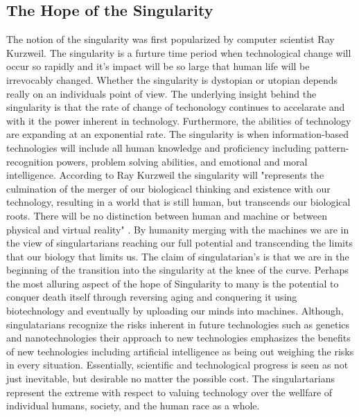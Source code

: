 \subsection{The Hope of the Singularity}
\label{sec:-singularity}
 The notion of the singularity was first popularized by computer scientist Ray Kurzweil. The singularity is a furture 
time period when technological change will occur so rapidly and it's impact will be so large that human life will be 
irrevocably changed. Whether the singularity is dystopian or utopian depends really on an individuals point of view. 
The underlying insight behind the singularity is that the rate of change of techonology continues to accelarate and with it
the power inherent in technology. Furthermore, the abilities of technology are expanding at an exponential rate. The singularity is when information-based technologies will include all human knowledge  and proficiency including pattern-recognition powers, problem solving abilities, and emotional and moral intelligence. According to Ray Kurzweil the singularity will "represents the culmination of the merger of our biologicacl thinking and existence with our technology, resulting in a world that is still human, but transcends our biological roots. There will be no distinction between human and machine or between physical and virtual reality" \cite{kurzweil2005singularity}. By humanity merging with the machines we are in the view of singulartarians reaching our full potential and transcending the limits that our biology that limits us. The claim of singulatarian's is that we are in the beginning of the transition into the singularity at the knee of the curve. Perhaps the most alluring aspect of the hope of Singularity to many is the potential to conquer death itself through reversing aging and conquering it using biotechnology and eventually by uploading our minds into machines. Although, singulatarians recognize the risks inherent in future technologies such as genetics and nanotechnologies their approach to new technologies emphasizes the benefits of new technologies including artificial intelligence as being out weighing the risks in every situation. Essentially, scientific and technological progress is seen as not just inevitable, but desirable no matter the possible cost. The singulartarians represent the extreme with respect to valuing technology over the wellfare of individual humans, society, and the human race as a whole. 
  

  



